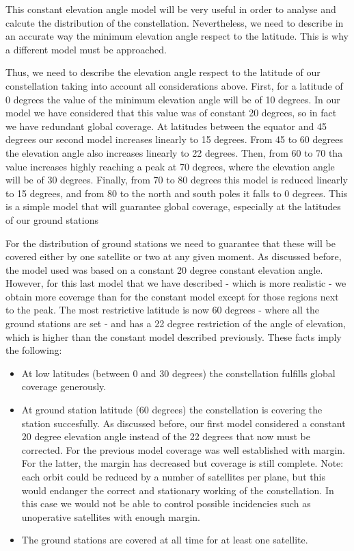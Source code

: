 This constant elevation angle model will be very useful in order to analyse and calcute the distribution of the constellation. Nevertheless, we need to describe in an accurate way the minimum elevation angle respect to the latitude. This is why a different model must be approached.

Thus, we need to describe the elevation angle respect to the latitude of our constellation taking into account all considerations above. First, for a latitude of 0 degrees the value of the minimum elevation angle will be of 10 degrees. In our model we have considered that this value was of constant 20 degrees, so in fact we have redundant global coverage. At latitudes between the equator and 45 degrees our second model increases linearly to 15 degrees. From 45 to 60 degrees the elevation angle also increases linearly to 22 degrees. Then, from 60 to 70 tha value increases highly reaching a peak at 70 degrees, where the elevation angle will be of 30 degrees. Finally, from 70 to 80 degrees this model is reduced linearly to 15 degrees, and from 80 to the north and south poles it falls to 0 degrees. This is a simple model that will guarantee global coverage, especially at the latitudes of our ground stations

For the distribution of ground stations we need to guarantee that these will be covered either by one satellite or two at any given moment. As discussed before, the model used was based on a constant 20 degree constant elevation angle. However, for this last model that we have described - which is more realistic - we obtain more coverage than for the constant model except for those regions next to the peak. The most restrictive latitude is now 60 degrees - where all the ground stations are set - and has a 22 degree restriction of the angle of elevation, which is higher than the constant model described previously. These facts imply the following:

\begin{itemize}
\item At low latitudes (between 0 and 30 degrees) the constellation fulfills global coverage generously.
\item At ground station latitude (60 degrees) the constellation is covering the station succesfully. As discussed before, our first model considered a constant 20 degree elevation angle instead of the 22 degrees that now must be corrected. For the previous model coverage was well established with margin. For the latter, the margin has decreased but coverage is still complete. Note: each orbit could be reduced by a number of satellites per plane, but this would endanger the correct and stationary working of the constellation. In this case we would not be able to control possible incidencies such as unoperative satellites with enough margin.
\item The ground stations are covered at all time for at least one satellite.
\end{itemize}

